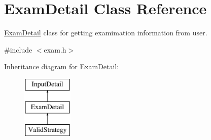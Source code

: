 \hypertarget{classExamDetail}{\section{Exam\-Detail Class Reference}
\label{classExamDetail}
}


\hyperlink{classExamDetail}{Exam\-Detail} class for getting examimation information from user.  




{\ttfamily \#include $<$exam.\-h$>$}

Inheritance diagram for Exam\-Detail\-:\begin{figure}[H]
\begin{center}
\leavevmode
\includegraphics[height=3.000000cm]{df/d4d/classExamDetail}
\end{center}
\end{figure}
